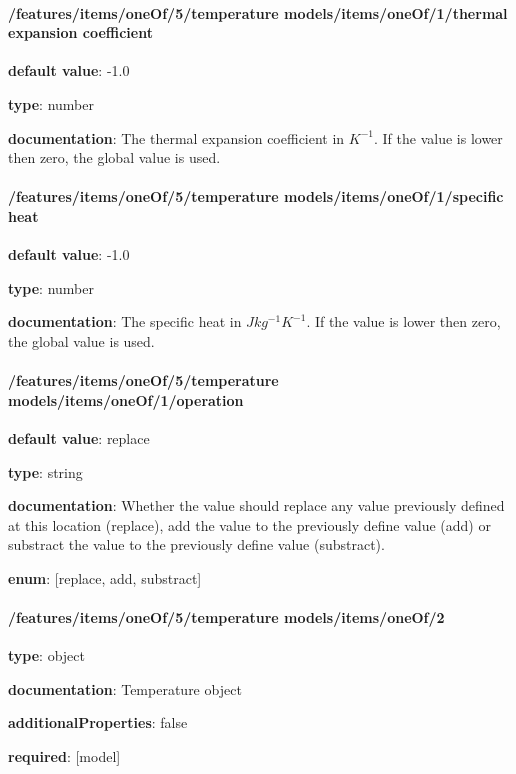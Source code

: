 \begin{itemized}
\end{itemized}\paragraph{/features/items/oneOf/5/temperature models/items/oneOf/1/thermal expansion coefficient} \begin{itemized}
\item {\bf default value}: -1.0
\item {\bf type}: number
\item {\bf documentation}: The thermal expansion coefficient in $K^{-1}$. If the value is lower then zero, the global value is used.
\end{itemized}\paragraph{/features/items/oneOf/5/temperature models/items/oneOf/1/specific heat} \begin{itemized}
\item {\bf default value}: -1.0
\item {\bf type}: number
\item {\bf documentation}: The specific heat in $J kg^{-1} K^{-1}$. If the value is lower then zero, the global value is used.
\end{itemized}\paragraph{/features/items/oneOf/5/temperature models/items/oneOf/1/operation} \begin{itemized}
\item {\bf default value}: replace
\item {\bf type}: string
\item {\bf documentation}: Whether the value should replace any value previously defined at this location (replace), add the value to the previously define value (add) or substract the value to the previously define value (substract).
\item {\bf enum}: [replace, add, substract]\end{itemized}\paragraph{/features/items/oneOf/5/temperature models/items/oneOf/2} \begin{itemized}
\item {\bf type}: object
\item {\bf documentation}: Temperature object
\item {\bf additionalProperties}: false
\item {\bf required}: [model]\end{itemized}
